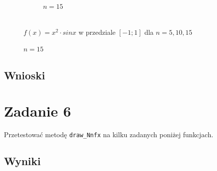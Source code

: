 \documentclass{article}
\def\v{0.47}
\begin{document}
\begin{figure}[H]
\begin{subfigure}[b]{\v\linewidth}
			\caption{$n = 15$}
		\end{subfigure}
	\\{$f(x) = x^2 \cdot sin x$ w przedziale $[-1;1]$ dla $n = 5,10,15$}
	\end{figure}
\subsection*{Wnioski}

\section*{Zadanie 6}
	Przetestować metodę \texttt{draw\_Nnfx} na kilku zadanych poniżej funkcjach.
\subsection*{Wyniki}
\end{document}
